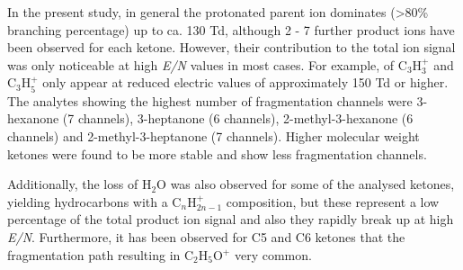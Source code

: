 In the present study, in general the protonated parent ion dominates (>80\% branching percentage) up to ca. 130 Td, although 2 - 7 further product ions have been observed for each ketone.
However, their contribution to the total ion signal was only noticeable at high \textit{E/N} values in most cases.
For example, of C$_3$H$_3^+$ and C$_3$H$_5^+$  only appear at reduced electric values of approximately 150 Td or higher.
The analytes showing the highest number of fragmentation channels were 3-hexanone (7 channels),
3-heptanone (6 channels),
2-methyl-3-hexanone (6 channels) 
and 2-methyl-3-heptanone (7 channels).
Higher molecular weight ketones were found to be more stable and show less  fragmentation channels.


Additionally, the loss of H$_2$O was also observed for some of the analysed ketones, yielding hydrocarbons with a  C$_n$H$_{2n-1}^{+}$  composition, but these represent a low percentage of the total product ion signal and also they rapidly break up at high \textit{E/N}.
Furthermore, it has been observed for C5 and C6 ketones that the fragmentation path resulting in C$_2$H$_5$O$^+$ very common.

